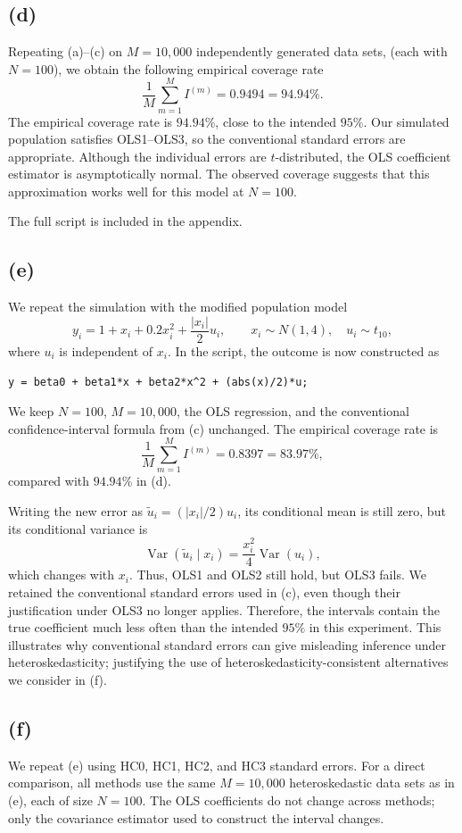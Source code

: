 \documentclass[11pt]{article}
\DeclareMathOperator{\Var}{Var}
\begin{document}
\subsection{(d)}
Repeating (a)--(c) on $M=10{,}000$ independently generated data sets,
(each with $N=100$), we obtain the following empirical coverage rate
\[
\frac{1}{M}\sum_{m=1}^{M}I^{(m)}=0.9494=94.94\%.
\]
The empirical coverage rate is $94.94\%$, close to the intended $95\%$.
Our simulated population satisfies OLS1--OLS3, so the conventional
standard errors are appropriate. Although the individual errors are
$t$-distributed, the OLS coefficient estimator is asymptotically normal.
The observed coverage suggests that this approximation works well for
this model at $N=100$.

The full script is included in the appendix.

\subsection{(e)}
We repeat the simulation with the modified population model
\[
y_i=1+x_i+0.2x_i^2+\frac{|x_i|}{2}u_i,
\qquad x_i\sim N(1,4),\quad u_i\sim t_{10},
\]
where $u_i$ is independent of $x_i$. In the script, the outcome is now
constructed as
\begin{lstlisting}[style=Rcode]
y = beta0 + beta1*x + beta2*x^2 + (abs(x)/2)*u;
\end{lstlisting}
We keep $N=100$, $M=10{,}000$, the OLS regression, and the conventional
confidence-interval formula from (c) unchanged. The empirical coverage
rate is
\[
\frac{1}{M}\sum_{m=1}^{M}I^{(m)}=0.8397=83.97\%,
\]
compared with $94.94\%$ in (d).

Writing the new error as $\tilde u_i=(|x_i|/2)u_i$, its conditional
mean is still zero, but its conditional variance is
\[
\Var(\tilde u_i\mid x_i)=\frac{x_i^2}{4}\Var(u_i),
\]
which changes with $x_i$. Thus, OLS1 and OLS2 still hold, but OLS3
fails. We retained the conventional standard errors used
in (c), even though their justification under OLS3 no longer applies.
Therefore, the intervals contain the true coefficient much less often than the
intended $95\%$ in this experiment. This illustrates why conventional
standard errors can give misleading inference under heteroskedasticity;
justifying the use of heteroskedasticity-consistent alternatives we consider in (f).
\subsection{(f)}
We repeat (e) using HC0, HC1, HC2, and HC3 standard errors. For a direct
comparison, all methods use the same $M=10{,}000$ heteroskedastic data
sets as in (e), each of size $N=100$. The OLS coefficients do not
change across methods; only the covariance estimator used to construct
the interval changes.
\end{document}

